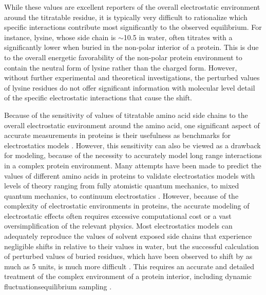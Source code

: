 While these \pKa{} values are excellent reporters of the overall electrostatic environment around the titratable residue, it is typically very difficult to rationalize which specific interactions contribute most significantly to the observed equilibrium. 
For instance, lysine, whose side chain \pKa{} is $\sim$10.5 in water, often titrates with a significantly lower \pKa{} when buried in the non-polar interior of a protein. 
This is due to the overall energetic favorability of the non-polar protein environment to contain the neutral form of lysine rather than the charged form. 
However, without further experimental and theoretical investigations, the perturbed \pKa{} values of lysine residues do not offer significant information with molecular level detail of the specific electrostatic interactions that cause the \pKa{} shift.  

Because of the sensitivity of \pKa{} values of titratable amino acid side chains to the overall electrostatic environment around the amino acid, one significant aspect of accurate \pKa{} measurements in proteins is their usefulness as benchmarks for electrostatics models \cite{Gibas1996, Antosiewicz1996, Fogolari2002, Li2005, Olsson2011, Witham2011, Meyer2015, Mehler1999}.
However, this sensitivity can also be viewed as a drawback for modeling, because of the necessity to accurately model long range interactions in a complex protein environment. 
Many attempts have been made to predict the \pKa{} values of different amino acids in proteins to validate electrostatics models with levels of theory ranging from fully atomistic quantum mechanics, to mixed quantum mechanics, to continuum electrostatics \cite{Gibas1996, Antosiewicz1996, Schutz2001, Warshel2006, Nielsen2011}.
However, because of the complexity of electrostatic environments in proteins, the accurate modeling of electrostatic effects often requires excessive computational cost or a vast oversimplification of the relevant physics. 
Most electrostatics models can adequately reproduce the \pKa{} values of solvent exposed side chains that experience negligible shifts in \pKa{} relative to their values in water, but the successful calculation of perturbed \pKa{} values of buried residues, which have been observed to shift by as much as 5 \pKa{} units, is much more difficult \cite{Schutz2001, Simonson2001}.
This requires an accurate and detailed treatment of the complex environment of a protein interior, including dynamic fluctuationsequilibrium sampling \cite{Schutz2001, Nielsen2011, Warshel2011, Alexov2011, Li2013}.

